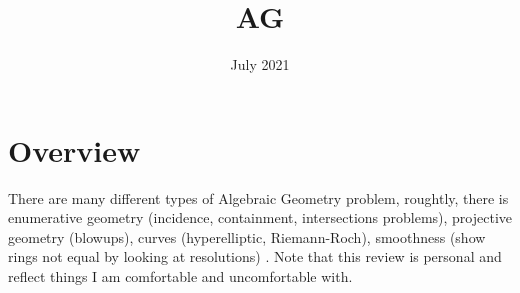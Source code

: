 \documentclass[main.tex]{subfiles}
\title{AG}
\date{July 2021}
\begin{document}
\maketitle

\section{Overview}
There are many different types of Algebraic Geometry problem, roughtly, there is enumerative geometry (incidence, containment, intersections problems), projective geometry (blowups), curves (hyperelliptic, Riemann-Roch), smoothness (show rings not equal by looking at resolutions) . Note that this review is personal and reflect things I am comfortable and uncomfortable with.
\end{document}
